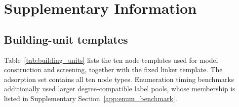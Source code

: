 \documentclass[a5paper, 10pt]{article}
\begin{document}
\singlespacing





\clearpage
\appendix
\section{Supplementary Information}
\label{app:supplementary}
\setcounter{equation}{0}
\renewcommand{\theequation}{A\arabic{equation}}
\renewcommand{\theHequation}{A.\arabic{equation}}
\setcounter{table}{0}
\renewcommand{\thetable}{A\arabic{table}}
\renewcommand{\theHtable}{A.\arabic{table}}
\setcounter{figure}{0}
\renewcommand{\thefigure}{A\arabic{figure}}
\renewcommand{\theHfigure}{A.\arabic{figure}}
\subsection{Building-unit templates}
\label{app:building_units}

Table~\ref{tab:building_units} lists the ten node templates used for model construction and screening, together with the fixed linker template. The adsorption set contains all ten node types. Enumeration timing benchmarks additionally used larger degree-compatible label pools, whose membership is listed in Supplementary Section~\ref{app:enum_benchmark}.
\end{document}
